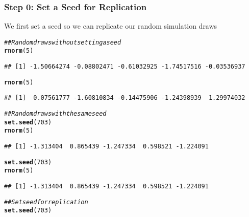 \documentclass{beamer}\usepackage[]{graphicx}\usepackage[]{color}
\makeatletter
\newcommand{\hlnum}[1]{\textcolor[rgb]{0.686,0.059,0.569}{#1}}%
\newcommand{\hlcom}[1]{\textcolor[rgb]{0.678,0.584,0.686}{\textit{#1}}}%
\newcommand{\hlstd}[1]{\textcolor[rgb]{0.345,0.345,0.345}{#1}}%
\newcommand{\hlkwd}[1]{\textcolor[rgb]{0.737,0.353,0.396}{\textbf{#1}}}%
\newenvironment{kframe}{%
 \def\at@end@of@kframe{}%
 \ifinner\ifhmode%
  \def\at@end@of@kframe{\end{minipage}}%
  \begin{minipage}{\columnwidth}%
 \fi\fi%
 \def\FrameCommand##1{\hskip\@totalleftmargin \hskip-\fboxsep
 \colorbox{shadecolor}{##1}\hskip-\fboxsep
     \hskip-\linewidth \hskip-\@totalleftmargin \hskip\columnwidth}%
 \MakeFramed {\advance\hsize-\width
   \@totalleftmargin\z@ \linewidth\hsize
   \@setminipage}}%
 {\par\unskip\endMakeFramed%
 \at@end@of@kframe}
\newenvironment{knitrout}{}{} %
\makeatother
\begin{document}
\begin{frame}[fragile]\frametitle{Step 0: Set a Seed for Replication}
	We first set a seed so we can replicate our random simulation draws 
    \vspace{1ex}
\begin{knitrout}\footnotesize
{}\color{fgcolor}\begin{kframe}
\begin{alltt}
\hlcom{## Random draws without setting a seed}
\hlkwd{rnorm}\hlstd{(}\hlnum{5}\hlstd{)}
\end{alltt}
\begin{verbatim}
## [1] -1.50664274 -0.08802471 -0.61032925 -1.74517516 -0.03536937
\end{verbatim}
\begin{alltt}
\hlkwd{rnorm}\hlstd{(}\hlnum{5}\hlstd{)}
\end{alltt}
\begin{verbatim}
## [1]  0.07561777 -1.60810834 -0.14475906 -1.24398939  1.29974032
\end{verbatim}
\begin{alltt}
\hlcom{## Random draws with the same seed}
\hlkwd{set.seed}\hlstd{(}\hlnum{703}\hlstd{)}
\hlkwd{rnorm}\hlstd{(}\hlnum{5}\hlstd{)}
\end{alltt}
\begin{verbatim}
## [1] -1.313404  0.865439 -1.247334  0.598521 -1.224091
\end{verbatim}
\begin{alltt}
\hlkwd{set.seed}\hlstd{(}\hlnum{703}\hlstd{)}
\hlkwd{rnorm}\hlstd{(}\hlnum{5}\hlstd{)}
\end{alltt}
\begin{verbatim}
## [1] -1.313404  0.865439 -1.247334  0.598521 -1.224091
\end{verbatim}
\begin{alltt}
\hlcom{## Set seed for replication}
\hlkwd{set.seed}\hlstd{(}\hlnum{703}\hlstd{)}
\end{alltt}
\end{kframe}
\end{knitrout}
\end{frame}
\end{document}
